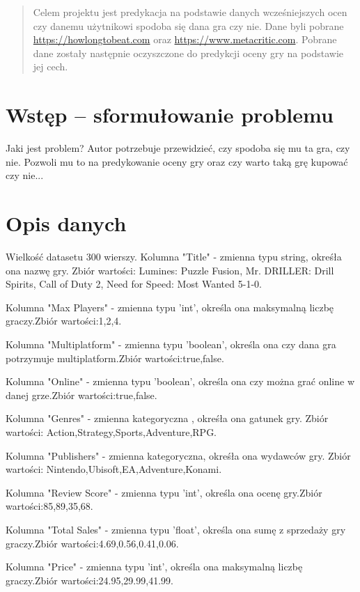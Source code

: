 \documentclass{article}
\begin{document}


\begin{abstract}
Celem projektu jest predykacja na podstawie danych wcześniejszych ocen czy danemu użytnikowi spodoba się dana gra czy nie. Dane byli pobrane \url{https://howlongtobeat.com} oraz \url{https://www.metacritic.com}. Pobrane dane zostały następnie oczyszczone  do predykcji oceny gry na podstawie jej cech.

\end{abstract}

\section{Wstęp -- sformułowanie problemu}
\label{sec:wstep}

Jaki jest problem?
Autor potrzebuje przewidzieć, czy spodoba się mu ta gra, czy nie. Pozwoli mu to na predykowanie oceny gry oraz czy warto taką grę kupować czy nie...

\section{Opis danych}
Wielkość datasetu 300 wierszy.
Kolumna "Title" - zmienna typu string, okreśła ona nazwę gry. Zbiór wartości: Lumines: Puzzle Fusion, Mr. DRILLER: Drill Spirits, Call of Duty 2, Need for Speed: Most Wanted 5-1-0.

Kolumna "Max Players" - zmienna typu 'int', określa ona maksymalną liczbę graczy.Zbiór wartości:1,2,4.

Kolumna "Multiplatform" - zmienna typu 'boolean', określa ona czy dana gra potrzymuje multiplatform.Zbiór wartości:true,false.

Kolumna "Online" - zmienna typu 'boolean', określa ona czy można grać online w danej grze.Zbiór wartości:true,false.

Kolumna "Genres" - zmienna kategoryczna , okreśła ona gatunek gry. Zbiór wartości: Action,Strategy,Sports,Adventure,RPG.

Kolumna "Publishers" - zmienna kategoryczna, okreśła ona wydawców gry. Zbiór wartości: Nintendo,Ubisoft,EA,Adventure,Konami.

Kolumna "Review Score" - zmienna typu 'int', określa ona ocenę gry.Zbiór wartości:85,89,35,68.

Kolumna "Total Sales" - zmienna typu 'float', określa ona sumę z sprzedaży gry graczy.Zbiór wartości:4.69,0.56,0.41,0.06.

Kolumna "Price" - zmienna typu 'int', określa ona maksymalną liczbę graczy.Zbiór wartości:24.95,29.99,41.99.
\end{document}
